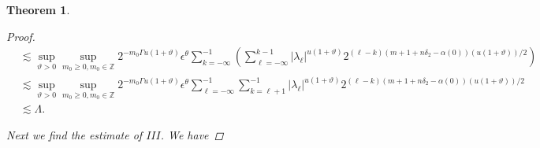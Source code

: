 \documentclass[oneside,reqno]{amsart}
\newtheorem{theorem}{Theorem}[section]
\numberwithin{equation}{section}
\theoremstyle{definition}
\begin{document}
\begin{theorem}
\begin{proof}
\begin{align*}
& \lesssim \sup_{\vartheta>0 }\sup _{m_0\geq 0, m_0\in  \mathbb{Z}} 2^{-m_0\Gamma u(1+\vartheta)} \epsilon  ^\theta \sum_{k=-\infty}^{-1}\left(\sum_{\ell=-\infty }^{k-1}\left|\lambda_\ell \right|^{u(1+\vartheta)} 2^{(\ell-k)\left(m+1+n \delta_{2}- \alpha(0)\right)(u(1+\vartheta))/2}\right)  \\
& \lesssim \sup_{\vartheta>0 }\sup _{m_0\geq 0, m_0\in  \mathbb{Z}} 2^{-m_0\Gamma u(1+\vartheta)} \epsilon  ^\theta \sum_{\ell=-\infty }^{-1}\sum_{k=\ell+1}^{-1}\left|\lambda_\ell \right|^{u(1+\vartheta)} 2^{(\ell-k)\left(m+1+n \delta_{2}- \alpha(0)\right)(u(1+\vartheta))/2}  \\
& \lesssim \Lambda .
\end{align*}





Next we find the  estimate of $ III$. We have


\end{proof}
\end{theorem}
\end{document}
